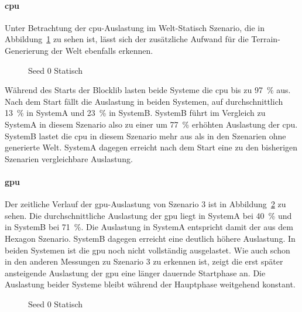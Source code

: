 \paragraph{\ac{cpu}}
Unter Betrachtung der \ac{cpu}-Auslastung im Welt-Statisch Szenario, die in Abbildung~\ref{fig:seed-0-static-cpu} zu sehen ist, lässt sich der zusätzliche Aufwand für die Terrain-Generierung der Welt ebenfalls erkennen.
\begin{figure}[!htbp]
	\caption{Seed 0 Statisch}\label{fig:seed-0-static-cpu}
\end{figure}
Während des Starts der Blocklib lasten beide Systeme die \ac{cpu} bis zu \SI{97}{\percent} aus. Nach dem Start fällt die Auslastung in beiden Systemen, auf durchschnittlich \SI{13}{\percent} in SystemA und \SI{23}{\percent} in SystemB.
SystemB führt im Vergleich zu SystemA in diesem Szenario also zu einer um \SI{77}{\percent} erhöhten Auslastung der \ac{cpu}. SystemB lastet die \ac{cpu} in diesem Szenario mehr aus als in den Szenarien ohne generierte Welt. SystemA dagegen erreicht nach dem Start eine zu den bisherigen Szenarien vergleichbare Auslastung.

\paragraph{\ac{gpu}}
Der zeitliche Verlauf der \ac{gpu}-Auslastung von Szenario 3 ist in Abbildung~\ref{fig:seed-0-static-gpu} zu sehen. Die durchschnittliche Auslastung der \ac{gpu} liegt in SystemA bei \SI{40}{\percent} und in SystemB bei \SI{71}{\percent}. Die Auslastung in SystemA entspricht damit der aus dem Hexagon Szenario. SystemB dagegen erreicht eine deutlich höhere Auslastung. In beiden Systemen ist die \ac{gpu} noch nicht vollständig ausgelastet. Wie auch schon in den anderen Messungen zu Szenario 3 zu erkennen ist, zeigt die erst später ansteigende Auslastung der \ac{gpu} eine länger dauernde Startphase an. Die Auslastung beider Systeme bleibt während der Hauptphase weitgehend konstant.
\begin{figure}[!htbp]
	\caption{Seed 0 Statisch}\label{fig:seed-0-static-gpu}
\end{figure}

